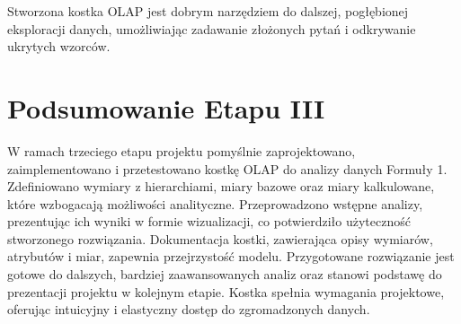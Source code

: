 \documentclass[a4paper,12pt]{article}
\begin{document}
Stworzona kostka OLAP jest dobrym narzędziem do dalszej, pogłębionej eksploracji danych, umożliwiając zadawanie złożonych pytań i odkrywanie ukrytych wzorców.

\section{Podsumowanie Etapu III}
W ramach trzeciego etapu projektu pomyślnie zaprojektowano, zaimplementowano i przetestowano kostkę OLAP do analizy danych Formuły 1. Zdefiniowano wymiary z hierarchiami, miary bazowe oraz miary kalkulowane, które wzbogacają możliwości analityczne. Przeprowadzono wstępne analizy, prezentując ich wyniki w formie wizualizacji, co potwierdziło użyteczność stworzonego rozwiązania.
Dokumentacja kostki, zawierająca opisy wymiarów, atrybutów i miar, zapewnia przejrzystość modelu.
Przygotowane rozwiązanie jest gotowe do dalszych, bardziej zaawansowanych analiz oraz stanowi podstawę do prezentacji projektu w kolejnym etapie. Kostka spełnia wymagania projektowe, oferując intuicyjny i elastyczny dostęp do zgromadzonych danych.
\end{document}
